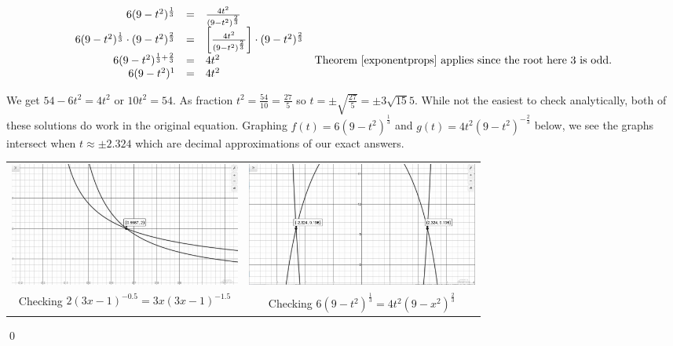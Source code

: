 \documentclass{ximera}
\begin{document}
\begin{ex}
\begin{enumerate}
\[ \begin{array}{rclr}

6(9-t^2)^{\frac{1}{3}} & = & \frac{4t^2}{(9-t^2)^{\frac{2}{3}}} & \\

6(9-t^2)^{\frac{1}{3}} \cdot (9-t^2)^{\frac{2}{3}} & = & \left[   \frac{4t^2}{(9-t^2)^{\frac{2}{3}}}  \right ] \cdot (9-t^2)^{\frac{2}{3}} & \\

6(9-t^2)^{\frac{1}{3} + \frac{2}{3}}& = & 4t^2 &  \text{Theorem \ref{exponentprops} applies since the root here $3$ is odd.} \\

6(9-t^2)^{1} & = & 4t^2 &\\   \end{array} \]

We get $54 - 6t^2 = 4t^2$ or $10t^2 = 54$.  As fraction $t^2 = \frac{54}{10} = \frac{27}{5}$ so $t = \pm \sqrt{\frac{27}{5}} = \pm 3 \sqrt{15}{5}$.  While not the easiest to check analytically, both of these solutions do work in the original equation.  Graphing $f(t) = 6(9-t^2)^{\frac{1}{3}} $ and $g(t) =  4t^2 (9-t^2)^{-\frac{2}{3}}$ below, we see the graphs intersect when $t \approx \pm 2.324$ which are decimal approximations of our exact answers.

\begin{center}

\begin{tabular}{cc}

\includegraphics[width=3in]{./PowerEqIneqGraphics/PowerEqEx05.jpg} & \includegraphics[width=3in]{./PowerEqIneqGraphics/PowerEqEx06.jpg} \\

Checking $2(3x-1)^{-0.5}  = 3x (3x-1)^{-1.5}$  & Checking  $6(9-t^2)^{\frac{1}{3}} = 4t^2 (9-x^2)^{\frac{2}{3}}$ \\

\end{tabular}

\end{center} 

\end{enumerate}

\qed

\end{ex}
\end{document}
